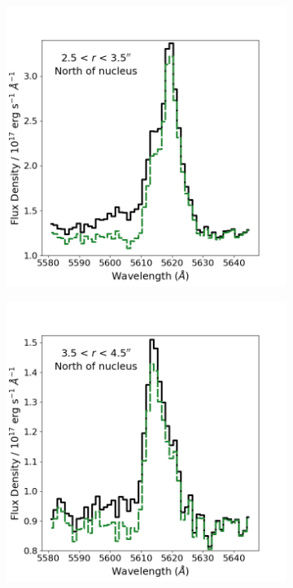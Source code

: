 \begin{figure}[!t]
\begin{subfigure}[]{0.48\linewidth}
    \end{subfigure}
    \begin{subfigure}[]{0.51\linewidth}
        \includegraphics[width=\linewidth, trim={0 0 0 1.5cm}, clip]{figures/muse_f13451_1232/broadsub_apertures/ap3_original_broadsub_comparison.png}
    \end{subfigure}
    \hfill
    \begin{subfigure}[]{0.48\linewidth}
        \includegraphics[width=\linewidth, trim={1.1cm 0 0 1.5cm}, clip]{figures/muse_f13451_1232/broadsub_apertures/ap4_original_broadsub_comparison.png}

\end{subfigure}
\end{figure}
